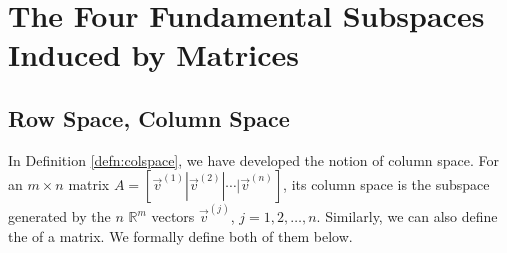 
\section{The Four Fundamental Subspaces Induced by Matrices}

\subsection{Row Space, Column Space}

In Definition \ref{defn:colspace}, we have developed the notion of column space. For an $m\times n$ matrix $A = [\vec{v}^{(1)}|\vec{v}^{(2)}|\cdots|\vec{v}^{(n)}]$, its column space is the subspace generated by the $n$ $\mathbb{R}^m$ vectors $\vec{v}^{(j)}$, $j = 1,2,\ldots,n$. Similarly, we can also define the  of a matrix. We formally define both of them below.

